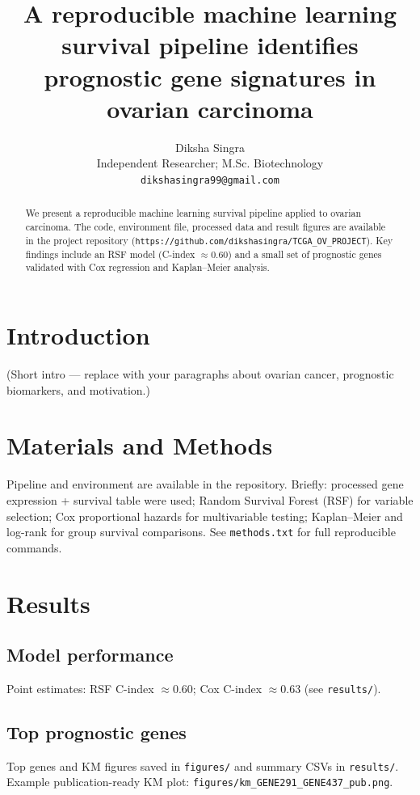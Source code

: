 \documentclass[11pt]{article}
\title{A reproducible machine learning survival pipeline identifies prognostic gene signatures in ovarian carcinoma}
\author{Diksha Singra\\Independent Researcher; M.Sc. Biotechnology\\\texttt{dikshasingra99@gmail.com}}
\date{}
\begin{document}
\maketitle

\begin{abstract}
We present a reproducible machine learning survival pipeline applied to ovarian carcinoma. The code, environment file, processed data and result figures are available in the project repository (\texttt{https://github.com/dikshasingra/TCGA\_OV\_PROJECT}). Key findings include an RSF model (C-index $\approx$0.60) and a small set of prognostic genes validated with Cox regression and Kaplan--Meier analysis.
\end{abstract}

\section{Introduction}
(Short intro — replace with your paragraphs about ovarian cancer, prognostic biomarkers, and motivation.)

\section{Materials and Methods}
Pipeline and environment are available in the repository. Briefly: processed gene expression + survival table were used; Random Survival Forest (RSF) for variable selection; Cox proportional hazards for multivariable testing; Kaplan--Meier and log-rank for group survival comparisons. See \texttt{methods.txt} for full reproducible commands.

\section{Results}
\subsection{Model performance}
Point estimates: RSF C-index $\approx$0.60; Cox C-index $\approx$0.63 (see \texttt{results/}).

\subsection{Top prognostic genes}
Top genes and KM figures saved in \texttt{figures/} and summary CSVs in \texttt{results/}. Example publication-ready KM plot: \texttt{figures/km\_GENE291\_GENE437\_pub.png}.
\end{document}
